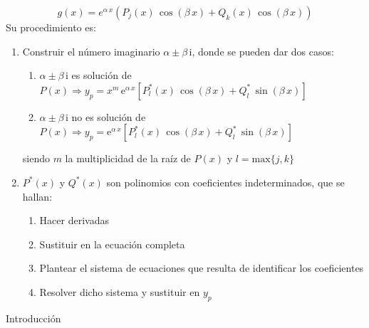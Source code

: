 \documentclass[11pt]{book} %
\makeatletter
\numberwithin{dummy}{section}
\theoremstyle{ocrenumbox}
\theoremstyle{blacknumex}
\theoremstyle{blacknumbox}
\theoremstyle{ocrenum}
\renewcommand{\section}{\@startsection{section}{1}{\z@}
{-4ex \@plus -1ex \@minus -.4ex}
{1ex \@plus.2ex }
{\normalfont\large\sffamily\bfseries}}
\makeatother
\begin{document}
\begin{itemize}
\begin{equation*}
        g(x)=e^{\alpha\,x}\left(P_j(x)\,\cos(\beta\,x)+Q_k(x)\,\cos(\beta\,x)\right)
    \end{equation*} 
    Su procedimiento es:
    \begin{enumerate}
        \item Construir el número imaginario $\alpha\pm\beta\,\mathrm{i}$, donde se pueden dar dos casos:
        \begin{enumerate}
            \item $\alpha\pm\beta\,\mathrm{i}$ es solución de $P(x)\Rightarrow y_p=x^m\,\mathrm{e}^{\alpha\,x}\left[ P_l^*(x)\,\cos(\beta\,x)+Q_l^*\,\sin(\beta\,x) \right]$
            \item $\alpha\pm\beta\,\mathrm{i}$ no es solución de $P(x)\Rightarrow y_p=\mathrm{e}^{\alpha\,x}\left[ P_l^*(x)\,\cos(\beta\,x)+Q_l^*\,\sin(\beta\,x) \right]$
        \end{enumerate}
        siendo $m$ la multiplicidad de la raíz de $P(x)$ y $l=\mathrm{
        max}\{j,k\}$
        \item $P^*(x)$ y $Q^*(x)$ son polinomios con coeficientes indeterminados, que se hallan:
        \begin{enumerate}
            \item Hacer derivadas
            \item Sustituir en la ecuación completa
            \item Plantear el sistema de ecuaciones que resulta de identificar los coeficientes
            \item Resolver dicho sistema y sustituir en $y_p$
        \end{enumerate}
    \end{enumerate}
\end{itemize}
	
	\section{Introducción}
	
\end{document}
